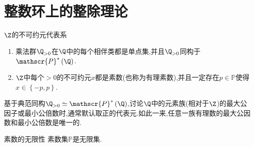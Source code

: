 \section{整数环上的整除理论}

\begin{proposition}{$\Z$的不可约元代表系}{}
	\begin{enumerate}
		\item 乘法群$\Q_{>0}$在$\Q$中的每个相伴类都是单点集,并且$\Q_{>0}$同构于$\mathscr{P}^{\ast}\left(\Q\right)$.
		\item $\Z$中每个$>0$的不可约元$x$都是素数(也称为有理素数),并且一定存在$p\in\mathbb{P}$使得$x\in\left\{-p,p\right\}$.
	\end{enumerate}
\end{proposition}

\begin{remark}{}{}
	基于典范同构$\Q_{>0}\simeq\mathscr{P}^{\ast}\left(\Q\right)$,讨论$\Q$中的元素族(相对于$\Z$)的最大公因子或最小公倍数时,通常默认取正的代表元.如此一来,任意一族有理数的最大公因数和最小公倍数是唯一的.
\end{remark}

\begin{proposition}{素数的无限性}{}
	素数集$\mathbb{P}$是无限集.
\end{proposition}